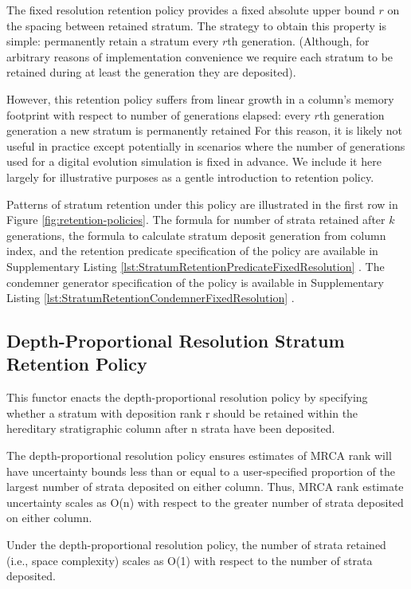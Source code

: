 The fixed resolution retention policy provides a fixed absolute upper bound $r$ on the spacing between retained stratum.
The strategy to obtain this property is simple: permanently retain a stratum every $r$th generation.
(Although, for arbitrary reasons of implementation convenience we require each stratum to be retained during at least the generation they are deposited).

However, this retention policy suffers from linear growth in a column's memory footprint with respect to number of generations elapsed: every $r$th generation generation a new stratum is permanently retained
For this reason, it is likely not useful in practice except potentially in scenarios where the number of generations used for a digital evolution simulation is fixed in advance.
We include it here largely for illustrative purposes as a gentle introduction to retention policy.

Patterns of stratum retention under this policy are illustrated in the first row in Figure \ref{fig:retention-policies}.
The formula for number of strata retained after $k$ generations, the formula to calculate stratum deposit generation from column index, and the retention predicate specification of the policy are available in Supplementary Listing \ref{lst:StratumRetentionPredicateFixedResolution} \citep{moreno2022hstratconceptsupplement}.
The condemner generator specification of the policy is available in Supplementary Listing \ref{lst:StratumRetentionCondemnerFixedResolution} \citep{moreno2022hstratconceptsupplement}.

\subsection{Depth-Proportional Resolution Stratum Retention Policy}

This functor enacts the depth-proportional resolution policy by specifying
whether a stratum with deposition rank r should be retained within the
hereditary stratigraphic column after n strata have been deposited.

The depth-proportional resolution policy ensures estimates of MRCA rank will
have uncertainty bounds less than or equal to a user-specified
proportion of the largest number of strata deposited on either column.
Thus, MRCA rank estimate uncertainty scales as O(n) with respect to the
greater number of strata deposited on either column.

Under the depth-proportional resolution policy, the number of strata
retained (i.e., space complexity) scales as O(1) with respect to the number
of strata deposited.

